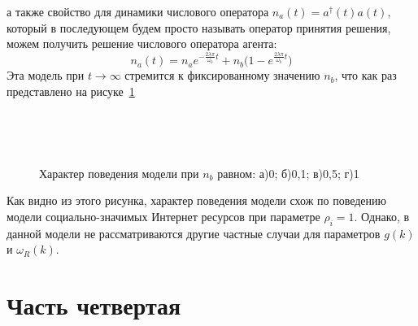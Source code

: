 а также свойство для динамики числового оператора $n_{a}(t) = a^{\dagger}(t) a(t)$, который в последующем
будем просто называть оператор принятия решения, можем получить решение числового оператора агента:
\begin{equation}\label{na_bagarello}
    n_{a}(t) = n_{a} e^{- \frac{2 \lambda \pi}{\omega_{b}} t} + n_{b} \Biggl( 1 - e^{\frac{2 \lambda \pi}{\omega_{b}} t} \Biggr)
\end{equation}
Эта модель при $ t \rightarrow \infty$ стремится к фиксированному значению $n_{b}$, что как раз
представлено на рисуке~\ref{fig:at_baga}
\begin{figure}[h!]
    \captionsetup{justification=centering}
    \begin{minipage}[h]{0.49\linewidth}
         \\
    \end{minipage}
    \begin{minipage}[h]{0.49\linewidth}
    \end{minipage}
    \begin{minipage}[h]{0.49\linewidth}
         \\
    \end{minipage}
    \begin{minipage}[h]{0.49\linewidth}
    \end{minipage}
    \caption{Характер поведения модели при $n_{b}$ равном: а)0; б)0,1; в)0,5; г)1}
    \label{fig:at_baga}
\end{figure}

Как видно из этого рисунка, характер поведения модели схож по поведению модели социально-значимых
Интернет ресурсов при параметре $\rho_{i} = 1$.
Однако, в данной модели не рассматриваются другие частные случаи для параметров $g(k)$ и $\omega_{R}(k)$.

\section{Часть четвертая}

